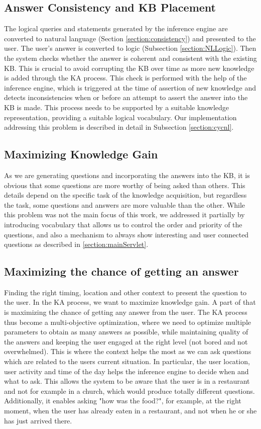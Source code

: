 \subsection{Answer Consistency and KB Placement}
The logical queries and statements generated by the inference engine are 
converted to natural language (Section \ref{section:consistency}) and presented to the user. The user's answer is converted to logic (Subsection \ref{section:NLLogic}). 
Then the system checks whether the answer is coherent and consistent with the 
existing KB. This is crucial to avoid corrupting the KB over time as more new 
knowledge is added through the KA process. This check is performed with the 
help of the inference engine, which is triggered at the time of assertion of 
new knowledge and detects inconsistencies when or before an attempt to 
assert the answer into the KB is made. This process needs to be supported by a 
suitable knowledge representation, providing a suitable logical vocabulary. 
Our implementation addressing this problem is described in detail in 
Subsection \ref{section:cycnl}.

\subsection{Maximizing Knowledge Gain} 
As we are generating questions and incorporating the answers into the KB, it 
is obvious that some questions are more worthy of being asked than others. 
This details depend on the specific task of the knowledge acquisition, but 
regardless the task, some questions and answers are more valuable than the 
other. While this problem was not the main focus of this work, we addressed it 
partially by introducing vocabulary that allows us to control the order and 
priority of the questions, and also a mechanism to always show interesting
and user connected questions as described in \autoref{section:mainServlet}.

\subsection{Maximizing the chance of getting an answer}
Finding the right timing, location and other context to present the question
to the user. In the KA process, we want to maximize knowledge gain. A part of 
that is maximizing the chance of getting any answer from the user. The KA 
process thus become a multi-objective optimization, where we need to optimize 
multiple parameters to obtain as many answers as possible, while maintaining 
quality of the answers and keeping the user engaged at the right level (not 
bored and not overwhelmed). This is where the context helps the most as we can 
ask questions which are related to the users current situation. In particular, 
the user location, user activity and time of the day helps the inference 
engine to decide when and what to ask. This allows the system to be aware that 
the user is in a restaurant and not for example in a church, which would 
produce  totally different questions. Additionally, it enables asking 
"how was the food?", for example, at the right moment, when the user has 
already eaten in a restaurant, and not when he or she has just arrived there.

